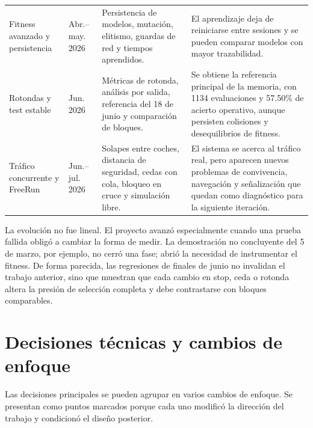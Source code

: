 {\begin{longtable}{L{3.0cm}L{1.8cm}L{3.0cm}L{4.8cm}}
Fitness avanzado y persistencia & Abr.--may. 2026 & Persistencia de modelos, mutación, elitismo, guardas de red y tiempos aprendidos. & El aprendizaje deja de reiniciarse entre sesiones y se pueden comparar modelos con mayor trazabilidad.\\
Rotondas y test estable & Jun. 2026 & Métricas de rotonda, análisis por salida, referencia del 18 de junio y comparación de bloques. & Se obtiene la referencia principal de la memoria, con 1134 evaluaciones y 57.50\% de acierto operativo, aunque persisten colisiones y desequilibrios de fitness.\\
Tráfico concurrente y FreeRun & Jun.--jul. 2026 & Solapes entre coches, distancia de seguridad, cedas con cola, bloqueo en cruce y simulación libre. & El sistema se acerca al tráfico real, pero aparecen nuevos problemas de convivencia, navegación y señalización que quedan como diagnóstico para la siguiente iteración.\\
\end{longtable}
}

La evolución no fue lineal. El proyecto avanzó especialmente cuando una prueba fallida obligó a cambiar la forma de medir. La demostración no concluyente del 5 de marzo, por ejemplo, no cerró una fase; abrió la necesidad de instrumentar el fitness. De forma parecida, las regresiones de finales de junio no invalidan el trabajo anterior, sino que muestran que cada cambio en stop, ceda o rotonda altera la presión de selección completa y debe contrastarse con bloques comparables.

\clearpage
\section{Decisiones técnicas y cambios de enfoque}

Las decisiones principales se pueden agrupar en varios cambios de enfoque. Se presentan como puntos marcados porque cada uno modificó la dirección del trabajo y condicionó el diseño posterior.

